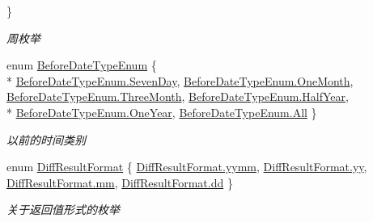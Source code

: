\begin{DoxyCompactItemize}
 \}
\begin{DoxyCompactList}\small\item\em 周枚举 \end{DoxyCompactList}\item 
enum \hyperlink{class_x_c_l_net_tools_1_1_enum_1_1_common_enum_abac0e863746b7fb8e6364c17f61648ea}{Before\-Date\-Type\-Enum} \{ \\*
\hyperlink{class_x_c_l_net_tools_1_1_enum_1_1_common_enum_abac0e863746b7fb8e6364c17f61648eaa89cbb363380ec655e2457e3b8ed9bfbd}{Before\-Date\-Type\-Enum.\-Seven\-Day}, 
\hyperlink{class_x_c_l_net_tools_1_1_enum_1_1_common_enum_abac0e863746b7fb8e6364c17f61648eaafbf813f42cef34e971078c047da659f8}{Before\-Date\-Type\-Enum.\-One\-Month}, 
\hyperlink{class_x_c_l_net_tools_1_1_enum_1_1_common_enum_abac0e863746b7fb8e6364c17f61648eaacbfdf32b0a04388155151bd3e1606312}{Before\-Date\-Type\-Enum.\-Three\-Month}, 
\hyperlink{class_x_c_l_net_tools_1_1_enum_1_1_common_enum_abac0e863746b7fb8e6364c17f61648eaab718c33478a0f1c03a3e50a5bd46869e}{Before\-Date\-Type\-Enum.\-Half\-Year}, 
\\*
\hyperlink{class_x_c_l_net_tools_1_1_enum_1_1_common_enum_abac0e863746b7fb8e6364c17f61648eaae0e2407272c8d5ee6e131146067c7055}{Before\-Date\-Type\-Enum.\-One\-Year}, 
\hyperlink{class_x_c_l_net_tools_1_1_enum_1_1_common_enum_abac0e863746b7fb8e6364c17f61648eaab1c94ca2fbc3e78fc30069c8d0f01680}{Before\-Date\-Type\-Enum.\-All}
 \}
\begin{DoxyCompactList}\small\item\em 以前的时间类别 \end{DoxyCompactList}\item 
enum \hyperlink{class_x_c_l_net_tools_1_1_enum_1_1_common_enum_aaefa466811a65c8971576fcdb80354a4}{Diff\-Result\-Format} \{ \hyperlink{class_x_c_l_net_tools_1_1_enum_1_1_common_enum_aaefa466811a65c8971576fcdb80354a4a5db5c5d516e72790f7e16ba4f37edfdb}{Diff\-Result\-Format.\-yymm}, 
\hyperlink{class_x_c_l_net_tools_1_1_enum_1_1_common_enum_aaefa466811a65c8971576fcdb80354a4a2fb1c5cf58867b5bbc9a1b145a86f3a0}{Diff\-Result\-Format.\-yy}, 
\hyperlink{class_x_c_l_net_tools_1_1_enum_1_1_common_enum_aaefa466811a65c8971576fcdb80354a4ab3cd915d758008bd19d0f2428fbb354a}{Diff\-Result\-Format.\-mm}, 
\hyperlink{class_x_c_l_net_tools_1_1_enum_1_1_common_enum_aaefa466811a65c8971576fcdb80354a4a1aabac6d068eef6a7bad3fdf50a05cc8}{Diff\-Result\-Format.\-dd}
 \}
\begin{DoxyCompactList}\small\item\em 关于返回值形式的枚举 \end{DoxyCompactList}\item 

\end{DoxyCompactItemize}
